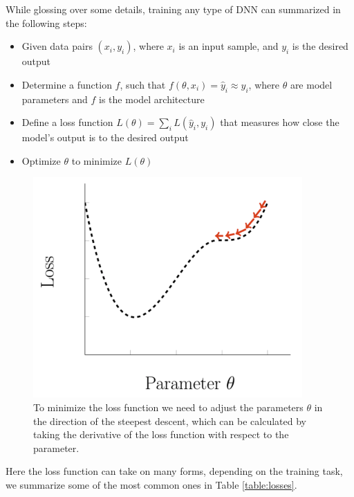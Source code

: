 While glossing over some details, training any type of DNN can summarized in the following steps:
\begin{itemize}
    \item Given data pairs $(x_i, y_i)$, where $x_i$ is an input sample, and $y_i$ is the desired output
    \item Determine a function $f$, such that $f(\theta, x_i) = \hat{y}_i \approx y_i$, where $\theta$ are model parameters and $f$ is the model architecture
    \item Define a loss function $L(\theta) = \sum_i L(\hat{y}_i, y_i)$ that measures how close the model's output is to the desired output
    \item Optimize $\theta$ to minimize $L(\theta)$
\end{itemize}
\begin{figure}[h]
    \includegraphics[width=\linewidth]{chapters/NLP/figures/loss.png}
    \caption{To minimize the loss function we need to adjust the parameters $\theta$ in the direction of the steepest descent, which can be calculated by taking the derivative of the loss function with respect to the parameter.}
    \label{fig:loss}
\end{figure}
Here the loss function can take on many forms, depending on the training task, we summarize some of the most common ones in Table \ref{table:losses}.
